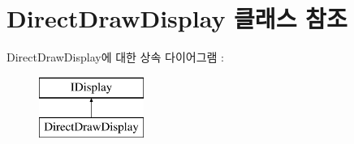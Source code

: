 \hypertarget{class_direct_draw_display}{}\section{Direct\+Draw\+Display 클래스 참조}
\label{class_direct_draw_display}
Direct\+Draw\+Display에 대한 상속 다이어그램 \+: \begin{figure}[H]
\begin{center}
\leavevmode
\includegraphics[height=2.000000cm]{class_direct_draw_display}
\end{center}
\end{figure}
